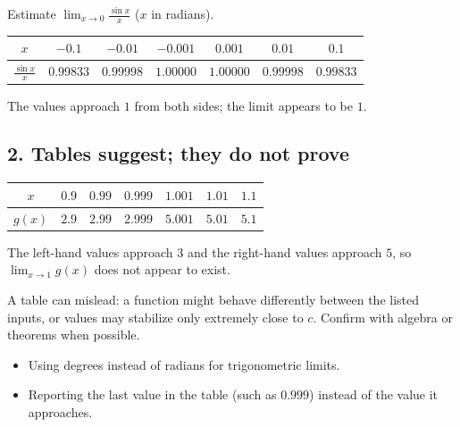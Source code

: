 \begin{example}[Example 1]
Estimate $\displaystyle\lim_{x\to0}\frac{\sin x}{x}$ ($x$ in radians).
\begin{center}\begin{tabular}{c|cccccc}$x$&$-0.1$&$-0.01$&$-0.001$&$0.001$&$0.01$&$0.1$\\\hline$\frac{\sin x}{x}$&$0.99833$&$0.99998$&$1.00000$&$1.00000$&$0.99998$&$0.99833$\end{tabular}\end{center}
\sol The values approach $1$ from both sides; the limit appears to be $1$.
\begin{center}
\end{center}
\end{example}

\subsection*{2. Tables suggest; they do not prove}
\begin{example}
\begin{center}\begin{tabular}{c|cccccc}$x$&$0.9$&$0.99$&$0.999$&$1.001$&$1.01$&$1.1$\\\hline$g(x)$&$2.9$&$2.99$&$2.999$&$5.001$&$5.01$&$5.1$\end{tabular}\end{center}
\sol The left-hand values approach $3$ and the right-hand values approach $5$, so $\lim_{x\to1}g(x)$ does not appear to exist.
\end{example}
A table can mislead: a function might behave differently between the listed inputs, or values may stabilize only extremely close to $c$. Confirm with algebra or theorems when possible.

\begin{mistakes}
\begin{itemize}
\item Using degrees instead of radians for trigonometric limits.
\item Reporting the last value in the table (such as $0.999$) instead of the value it approaches.
\end{itemize}
\end{mistakes}

